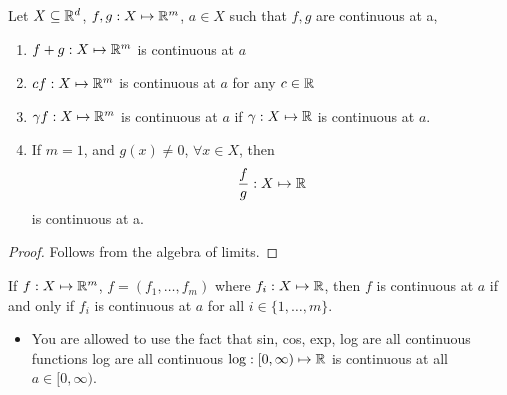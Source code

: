 \documentclass[openany]{report}
\begin{document}
\begin{prop}
    Let $X \subseteq \mathbb{R}^d$, $f,g: X \mapsto \mathbb{R}^m$, $a \in X$ such that $f,g$ are continuous at a,
    \begin{enumerate}[label=(\roman*)]
        \item $f+g: X \mapsto \mathbb{R}^m$ is continuous at $a$
        \item $cf: X \mapsto \mathbb{R}^m$ is continuous at $a$ for any $c \in \mathbb{R}$
        \item $\gamma f: X \mapsto \mathbb{R}^m$ is continuous at $a$ if $\gamma: X \mapsto \mathbb{R}$ is continuous at $a$. 
        \item If $m=1$, and $g(x) \neq 0$, $\forall x \in X$, then 
        \[\frac{f}{g}: X \mapsto \mathbb{R}\]
        is continuous at a.
    \end{enumerate}
\end{prop}
    \begin{proof}
        Follows from the algebra of limits.
    \end{proof}
    If $f: X \mapsto \mathbb{R}^m$, $f = (f_1, \ldots, f_m)$ where $f_i: X \mapsto \mathbb{R}$, then $f$ is continuous at $a$ if and only if $f_i$ is continuous at $a$ for all $i \in \{1, \ldots, m\}$.
    \begin{itemize}
        \item You are allowed to use the fact that sin, cos, exp, log are all continuous functions log are all continuous $\log: [0,\infty) \mapsto \mathbb{R}$ is continuous at all $a \in [0,\infty)$.
    \end{itemize}
\end{document}
